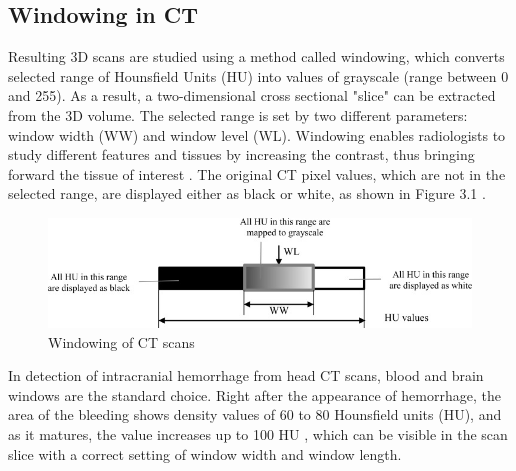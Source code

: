 \subsection*{Windowing in CT}
Resulting 3D scans are studied using a method called windowing, which converts selected range of Hounsfield Units (HU) into values of grayscale (range between 0 and 255).  As a result, a two-dimensional cross sectional "slice" can be extracted from the 3D volume. The selected range is set by two different parameters: window width (WW) and window level (WL). Windowing enables radiologists to study different features and tissues by increasing the contrast, thus bringing forward the tissue of interest \cite{windowClassBiomArt}. The original CT pixel values, which are not in the selected range, are displayed either as black or white, as shown in Figure 3.1 .

\begin{figure}[h]
\begin{centering}
\includegraphics[width=15cm]{assets/images/windowingHU}
\par\end{centering}
\caption{Windowing of CT scans
\label{fig:windowing} }
\end{figure}

In detection of intracranial hemorrhage from head CT scans, blood and brain windows are the standard choice. Right after the appearance of hemorrhage, the area of the bleeding shows density values of 60 to 80 Hounsfield units (HU), and as it matures, the value increases up to 100 HU  \cite{principlesOfCT}, which can be visible in the scan slice with a correct setting of window width and window length.

